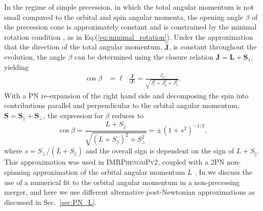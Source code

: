 \documentclass[%
aps,
prd,
amssymb,
amsmath,
amsfonts,
eqsecnum,
showpacs,
nofootinbib,
floatfix,
twocolumn,
twoside,
a4paper,
superscriptaddress
]{revtex4-1}
\newcommand{\n}{\newline}
\newcommand{\bfJ}{\boldsymbol{J} \xspace}
\newcommand{\bfL}{\boldsymbol{L} \xspace}
\newcommand{\bfSone}{\boldsymbol{S}_1 \xspace}
\newcommand{\bfell}{\boldsymbol{\ell} \xspace}
\newcommand{\ppvtwo}{\textsc{IMRPhenomPv2}\xspace}
\begin{document}
In the regime of simple precession, in which the total angular momentum is not small compared to the orbital and spin angular momenta, the opening angle $\beta$ of the precession cone is approximately constant and is constrained by the minimal rotation condition \cite{Boyle:2011gg}, as in Eq.(\ref{eq:minimal_rotation}).
Under the approximation that the direction of the total angular momentum, $\hat{\bfJ}$, is constant throughout the evolution, the angle $\beta$ can be determined using the closure relation $\bfJ = \bfL + \bfSone$,
yielding
\begin{align}
    \cos \beta &= \bfell \cdot \frac{\bfJ}{| \bfJ |} = \frac{J_{\ell}}{\sqrt{ J^2_{\ell} + J^2_n + J^2_{\lambda} }} .
\end{align}
With a PN re-expansion of the right hand side and decomposing the spin into contributions parallel and perpendicular to the orbital angular momentum, $\boldsymbol{S} = \boldsymbol{S}_{\parallel} + \boldsymbol{S}_{\perp}$, the expression for $\beta$ reduces to \cite{Bohe:PPv2}
\begin{equation}\label{eq:cos_beta}
    \cos \beta = \frac{L + S_{\parallel}}{\sqrt{ (L + S_{\parallel})^2 + S^2_{\perp}}} = \pm (1 + s^2)^{-1/2},
\end{equation}
where $s = S_{\perp} / (L + S_{\parallel})$ and the overall sign is dependent on the sign of $L + S_{\parallel}$. This approximation was used in \ppvtwo, coupled with a 2PN non-spinning approximation of the orbital angular momentum $L$ \cite{Kidder:1995zr}. 
In \cite{phenomt} we discuss the use of a numerical fit to the orbital angular momentum in a non-precessing merger,
and here we use different alternative post-Newtonian approximations as discussed in Sec.~\ref{sec:PN_L}.
\end{document}
